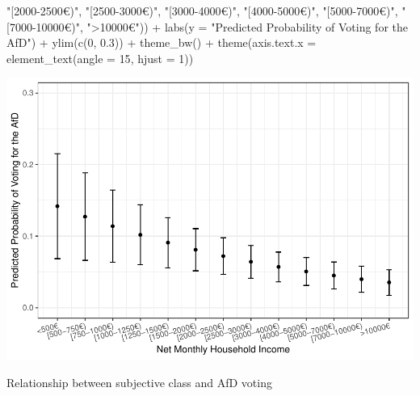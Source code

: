 \documentclass[
]{article}
\newenvironment{Shaded}{\begin{snugshade}}{\end{snugshade}}
\newcommand{\AttributeTok}[1]{\textcolor[rgb]{0.77,0.63,0.00}{#1}}
\newcommand{\DecValTok}[1]{\textcolor[rgb]{0.00,0.00,0.81}{#1}}
\newcommand{\FloatTok}[1]{\textcolor[rgb]{0.00,0.00,0.81}{#1}}
\newcommand{\FunctionTok}[1]{\textcolor[rgb]{0.00,0.00,0.00}{#1}}
\newcommand{\NormalTok}[1]{#1}
\newcommand{\SpecialCharTok}[1]{\textcolor[rgb]{0.00,0.00,0.00}{#1}}
\newcommand{\StringTok}[1]{\textcolor[rgb]{0.31,0.60,0.02}{#1}}
\begin{document}
\begin{Shaded}
\begin{Highlighting}[]
                                \StringTok{"[2000{-}2500€)"}\NormalTok{, }\StringTok{"[2500{-}3000€)"}\NormalTok{,}
                                \StringTok{"[3000{-}4000€)"}\NormalTok{, }\StringTok{"[4000{-}5000€)"}\NormalTok{,}
                                \StringTok{"[5000{-}7000€)"}\NormalTok{, }\StringTok{"[7000{-}10000€)"}\NormalTok{,}
                                \StringTok{"\textgreater{}10000€"}\NormalTok{)) }\SpecialCharTok{+}
  \FunctionTok{labs}\NormalTok{(}\AttributeTok{y =} \StringTok{"Predicted Probability of Voting for the AfD"}\NormalTok{) }\SpecialCharTok{+}
  \FunctionTok{ylim}\NormalTok{(}\FunctionTok{c}\NormalTok{(}\DecValTok{0}\NormalTok{, }\FloatTok{0.3}\NormalTok{)) }\SpecialCharTok{+}
  \FunctionTok{theme\_bw}\NormalTok{() }\SpecialCharTok{+}
  \FunctionTok{theme}\NormalTok{(}\AttributeTok{axis.text.x =} \FunctionTok{element\_text}\NormalTok{(}\AttributeTok{angle =} \DecValTok{15}\NormalTok{, }\AttributeTok{hjust =} \DecValTok{1}\NormalTok{))}
\end{Highlighting}
\end{Shaded}

\includegraphics{AVCD_Final_Assignment-Edenhofer_files/figure-latex/afd-household-income-1.pdf}

Relationship between subjective class and AfD voting
\end{document}
